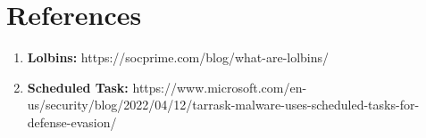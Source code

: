 \setcounter{secnumdepth}{-1}

\chapter{References}

\begin{enumerate}
     \item \textbf{Lolbins:} https://socprime.com/blog/what-are-lolbins/
     \item \textbf{Scheduled Task:} https://www.microsoft.com/en-us/security/blog/2022/04/12/tarrask-malware-uses-scheduled-tasks-for-defense-evasion/
\end{enumerate}



